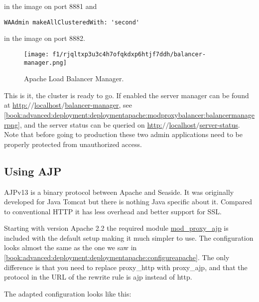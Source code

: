 \documentclass[a4paper,10pt,twoside]{book}
\newcommand{\ct}[1]{{\small\ttfamily\textup{#1}}}
\begin{document}
in the image on port 8881 and

\begin{lstlisting}
WAAdmin makeAllClusteredWith: 'second'
\end{lstlisting}

in the image on port 8882.

\begin{figure}[h!tbp]
	\begin{center}
		\texttt{[image: f1/rjqltxp3u3c4h7ofqkdxp6htjf7ddh/balancer-manager.png]}
		\caption{Apache Load Balancer Manager.\label{book:advanced:deployment:deploymentapache:modproxybalancer:balancermanagerpng}}
	\end{center}
\end{figure}


This is it, the cluster is ready to go. If enabled the server manager can be found at \href{http://localhost/balancer-manager}{http:$/$$/$localhost$/$balancer-manager}, see \autoref{book:advanced:deployment:deploymentapache:modproxybalancer:balancermanagerpng}, and the server status can be queried on \href{http://localhost/server-status}{http:$/$$/$localhost$/$server-status}. Note that before going to production these two admin applications need to be properly protected from unauthorized access.

\subsection{Using AJP}
\label{book:advanced:deployment:deploymentapache:modproxyajp}

AJPv13 is a binary protocol between Apache and Seaside. It was originally developed for Java Tomcat but there is nothing Java specific about it. Compared to conventional HTTP it has less overhead and better support for SSL.

Starting with version Apache 2.2 the required module  \href{http://httpd.apache.org/docs/2.2/mod/mod_proxy_ajp.html}{mod\_proxy\_ajp}
is included with the default setup making it much simpler to use. The configuration looks almost the same as the one we saw in \autoref{book:advanced:deployment:deploymentapache:configureapache}. The only difference is that you need to replace \ct{proxy\_http} with \ct{proxy\_ajp}, and that the protocol in the URL of the rewrite rule is \ct{ajp} instead of \ct{http}.

The adapted configuration looks like this:
\end{document}
